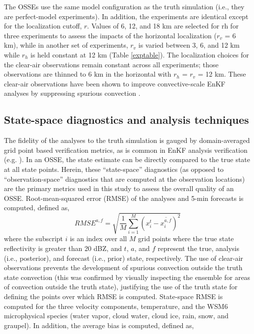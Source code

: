 The OSSEs use the same model configuration as the truth simulation (i.e., they are perfect-model experiments). In addition, the experiments are identical except for the localization cutoff, \(r\). Values of 6, 12, and 18 km are selected for rh for three experiments to assess the impacts of the horizontal localization (\(r_v\)  = 6 km), while in another set of experiments, \(r_v\) is varied between 3, 6, and 12 km while \(r_h\) is held constant at 12 km (Table \ref{exptable}). The localization choices for the clear-air observations remain constant across all experiments; those observations are thinned to 6 km in the horizontal with \(r_h\) = \(r_v\) = 12 km. These clear-air observations have been shown to improve convective-scale EnKF analyses by suppressing spurious convection \citep{aksoyetal09}. 

\subsection{State-space diagnostics and analysis techniques}
\label{statespace}
The fidelity of the analyses to the truth simulation is gauged by domain-averaged grid point based verification metrics, as is common in EnKF analysis verification (e.g. \citealt{dowelletal04}). In an OSSE, the state estimate can be directly compared to the true state at all state points. Herein, these “state-space” diagnostics (as opposed to “observation-space” diagnostics that are computed at the observation locations) are the primary metrics used in this study to assess the overall quality of an OSSE. Root-mean-squared error (RMSE) of the analyses and 5-min forecasts is computed, defined as,
\begin{equation}
   RMSE^{a,f} = \sqrt{\frac{1}{M}\sum_{i=1}^{M} (x_i^t - \overline{x_i^{a,f}})^2} 
\label{rmse}
\end{equation}
where the subscript \(i\) is an index over all \(M\) grid points where the true state reflectivity is greater than 20 dBZ, and \(t\), \(a\), and \(f\) represent the true, analysis (i.e., posterior), and forecast (i.e., prior) state, respectively. The use of clear-air observations prevents the development of spurious convection outside the truth state convection (this was confirmed by visually inspecting the ensemble for areas of convection outside the truth state), justifying the use of the truth state for defining the points over which RMSE is computed. State-space RMSE is computed for the three velocity components, temperature, and the WSM6 microphysical species (water vapor, cloud water, cloud ice, rain, snow, and graupel). In addition, the average bias is computed, defined as,
